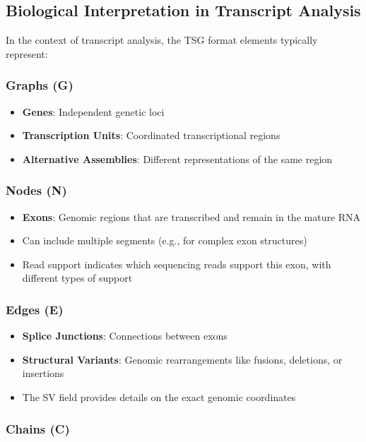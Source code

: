 \documentclass{article}
\begin{document}
\subsection{Biological Interpretation in Transcript Analysis}

In the context of transcript analysis, the TSG format elements typically represent:

\subsubsection{Graphs (G)}

\begin{itemize}
	\item \textbf{Genes}: Independent genetic loci
	\item \textbf{Transcription Units}: Coordinated transcriptional regions
	\item \textbf{Alternative Assemblies}: Different representations of the same region
\end{itemize}

\subsubsection{Nodes (N)}

\begin{itemize}
	\item \textbf{Exons}: Genomic regions that are transcribed and remain in the mature RNA
	\item Can include multiple segments (e.g., for complex exon structures)
	\item Read support indicates which sequencing reads support this exon, with different types of support
\end{itemize}

\subsubsection{Edges (E)}

\begin{itemize}
	\item \textbf{Splice Junctions}: Connections between exons
	\item \textbf{Structural Variants}: Genomic rearrangements like fusions, deletions, or insertions
	\item The SV field provides details on the exact genomic coordinates
\end{itemize}

\subsubsection{Chains (C)}
\end{document}
